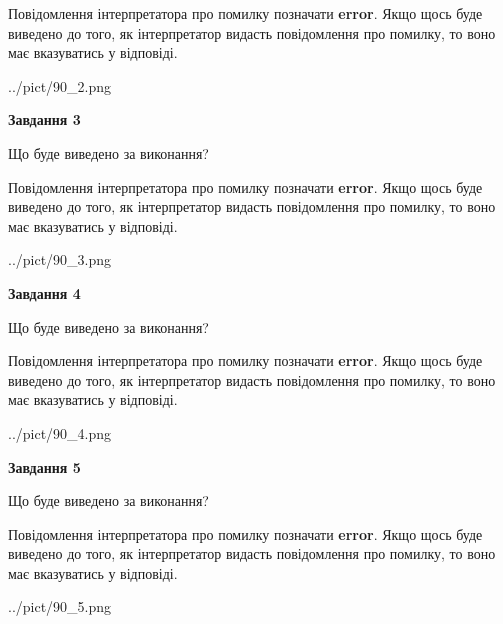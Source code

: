 \documentclass[12pt, ukrainian]{article}
\begin{document}
{\begin {large}
Повідомлення інтерпретатора про помилку позначати \textbf{error}.
Якщо щось буде виведено до того, як інтерпретатор видасть повідомлення про помилку, 
то воно має вказуватись у відповіді. \par


\begin{center}
	{../pict/90_2.png}
\end{center}
\newpage

{\begin {center}\textbf{Завдання 3}\end {center}}\par
Що буде виведено за виконання?

Повідомлення інтерпретатора про помилку позначати \textbf{error}.
Якщо щось буде виведено до того, як інтерпретатор видасть повідомлення про помилку, 
то воно має вказуватись у відповіді. \par


\begin{center}
	{../pict/90_3.png}
\end{center}
\newpage

{\begin {center}\textbf{Завдання 4}\end {center}}\par
Що буде виведено за виконання?

Повідомлення інтерпретатора про помилку позначати \textbf{error}.
Якщо щось буде виведено до того, як інтерпретатор видасть повідомлення про помилку, 
то воно має вказуватись у відповіді. \par


\begin{center}
	{../pict/90_4.png}
\end{center}
\newpage

{\begin {center}\textbf{Завдання 5}\end {center}}\par
Що буде виведено за виконання?

Повідомлення інтерпретатора про помилку позначати \textbf{error}.
Якщо щось буде виведено до того, як інтерпретатор видасть повідомлення про помилку, 
то воно має вказуватись у відповіді. \par


\begin{center}
	{../pict/90_5.png}
\end{center}
\newpage


\end{large}}
\end{document}
